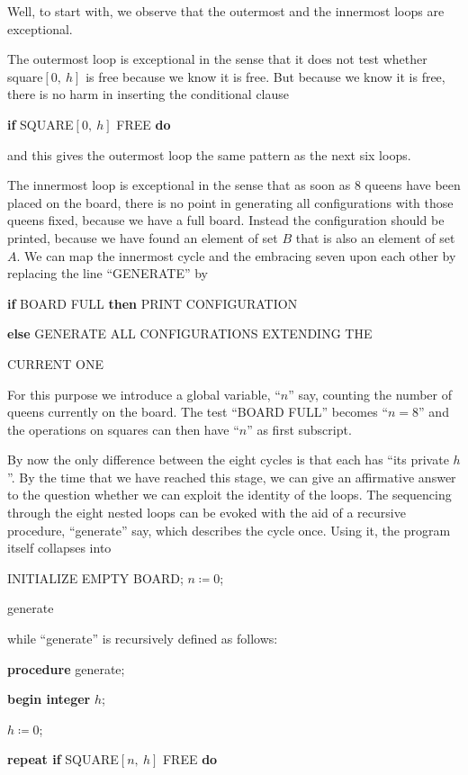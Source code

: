 Well, to start with, we observe that the outermost and the innermost loops are exceptional.

The outermost loop is exceptional in the sense that it does not test whether square$[0,\ h]$ is free because we know it is free. But because we know it is free, there is no harm in inserting the conditional clause

\quad \textbf{if} SQUARE$[0,\ h]$ FREE \textbf{do}

\noindent
and this gives the outermost loop the same pattern as the next six loops.

The innermost loop is exceptional in the sense that as soon as 8 queens have been placed on the board, there is no point in generating all configurations with those queens fixed, because we have a full board. Instead the configuration should be printed, because we have found an element of set $B$ that is also an element of set $A$. We can map the innermost cycle and the embracing seven upon each other by replacing the line ``GENERATE'' by

\textbf{if} BOARD FULL \textbf{\textbf{then}} PRINT CONFIGURATION

\quad \textbf{else} GENERATE ALL CONFIGURATIONS EXTENDING THE

\quad\quad CURRENT ONE

For this purpose we introduce a global variable, ``$n$'' say, counting the number of queens currently on the board. The test ``BOARD FULL'' becomes ``$n = 8$'' and the operations on squares can then have ``$n$'' as first subscript.

By now the only difference between the eight cycles is that each has ``its private $h$''. By the time that we have reached this stage, we can give an affirmative answer to the question whether we can exploit the identity of the loops. The sequencing through the eight nested loops can be evoked with the aid of a recursive procedure, ``generate'' say, which describes the cycle once. Using it, the program itself collapses into

\quad INITIALIZE EMPTY BOARD; $n \coloneq 0$;

\quad generate

\noindent
while ``generate'' is recursively defined as follows:

\textbf{procedure} generate;

\textbf{begin integer} $h$;

$h \coloneq 0$;

\textbf{repeat if} SQUARE$[n,\ h]$ FREE \textbf{do}

